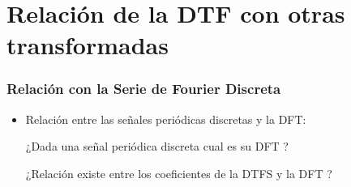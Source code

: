 



\section{Relación de la DTF con otras transformadas}



\begin{frame}
\frametitle{Relación con la Serie de Fourier Discreta}


\vspace{-0.2cm}

\footnotesize
\begin{itemize}
 \item \alert{Relación entre las señales periódicas discretas y la DFT:}

\hspace{0.5cm}\alert{¿Dada una señal periódica discreta cual es su DFT ?}

\hspace{0.5cm}\alert{¿Relación existe entre los coeficientes de la DTFS y la DFT ?}
\end{itemize}

\vspace{-0.3cm}

\end{frame}

